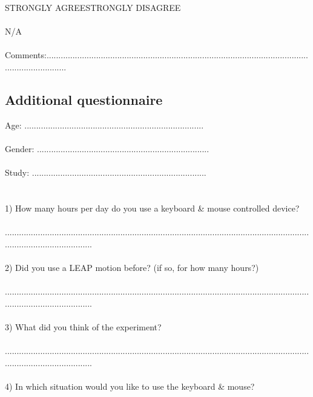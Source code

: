 \begin{appendix}
{STRONGLY AGREE\tab\tab\tab\tab\tab STRONGLY DISAGREE\\
\\
\tab\tab N/A\\
\\
Comments:.........................................................................................................................................

\newpage
\subsection{Additional questionnaire}
\label{appendix:additional_questionnaire}


Age: ............................................................................\\
\\
Gender: .........................................................................\\
\\
Study: ..........................................................................\\
\\
\\
1) How many hours per day do you use a keyboard \& mouse controlled device?\\
\\
......................................................................................................................................................................\\
\\
2) Did you use a LEAP motion before? (if so, for how many hours?)\\
\\
......................................................................................................................................................................\\
\\
3) What did you think of the experiment?\\
\\
......................................................................................................................................................................\\
\\
4) In which situation would you like to use the keyboard \& mouse?\\
}
\end{appendix}
